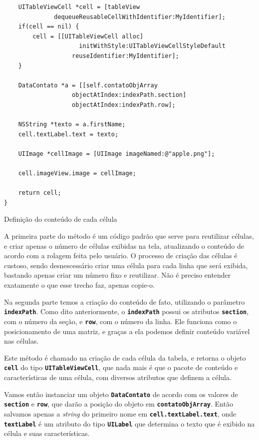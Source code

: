 \documentclass[a4paper,12pt,brazil,doubleside]{book}
\begin{document}
\begin{singlespace}
\begin{listing}[H]
\begin{verbatim}
    UITableViewCell *cell = [tableView 
              dequeueReusableCellWithIdentifier:MyIdentifier];
    if(cell == nil) {
        cell = [[UITableViewCell alloc] 
                     initWithStyle:UITableViewCellStyleDefault
                   reuseIdentifier:MyIdentifier];
    }

    DataContato *a = [[self.contatoObjArray
                   objectAtIndex:indexPath.section]
                   objectAtIndex:indexPath.row];

    NSString *texto = a.firstName;
    cell.textLabel.text = texto;
        
    UIImage *cellImage = [UIImage imageNamed:@"apple.png"];
        
    cell.imageView.image = cellImage;
    
    return cell;
}
\end{verbatim}
\caption{Definição do conteúdo de cada célula}
\end{listing}


A primeira parte do método é um código padrão que serve para reutilizar células, e criar apenas o número de células exibidas na tela, atualizando o conteúdo de acordo com a rolagem feita pelo usuário. O processo de criação das células é custoso, sendo desnescessário criar uma célula para cada linha que será exibida, bastando apenas criar um número fixo e reutilizar. Não é preciso entender exatamente o que esse trecho faz, apenas copie-o.

Na segunda parte temos a criação do conteúdo de fato, utilizando o parâmetro \texttt{\textbf{indexPath}}. Como dito anteriormente, o \texttt{\textbf{indexPath}} possui os atributos \texttt{\textbf{section}}, com o número da seção, e \texttt{\textbf{row}}, com o número da linha. Ele funciona como o posicionamento de uma matriz, e graças a ela podemos definir conteúdo variável nas células.

Este método é chamado na criação de cada célula da tabela, e retorna o objeto \texttt{\textbf{cell}} do tipo \texttt{\textbf{UITableViewCell}}, que nada mais é que o pacote de conteúdo e características de uma célula, com diversos atributos que definem a célula.

Vamos então instanciar um objeto \texttt{\textbf{DataContato}} de acordo com os valores de \texttt{\textbf{section}} e \texttt{\textbf{row}}, que darão a posição do objeto em \texttt{\textbf{contatoObjArray}}. Então salvamos apenas a \emph{string} do primeiro nome em \texttt{\textbf{cell.textLabel.text}}, onde \texttt{\textbf{textLabel}} é um atributo do tipo \texttt{\textbf{UILabel}} que determina o texto que é exibido na célula e suas características.


\end{singlespace}
\end{document}
